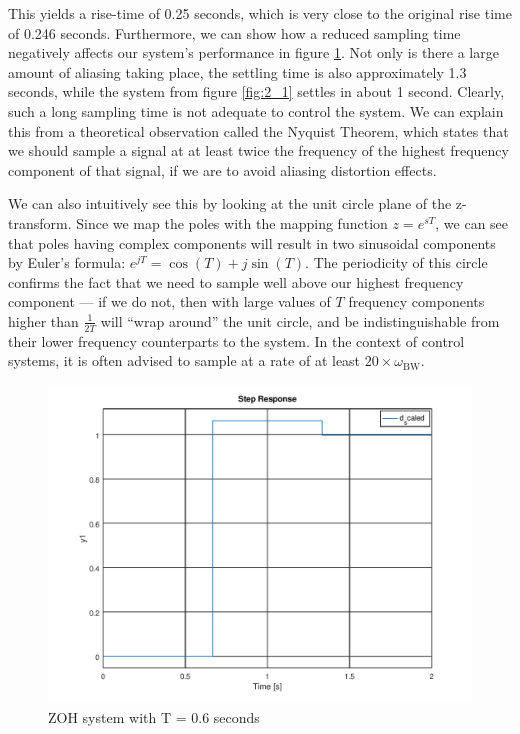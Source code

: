 \documentclass[a4paper, 12pt]{article}
\begin{document}
This yields a rise-time of 0.25 seconds, which is very close to the original
rise time of 0.246 seconds. Furthermore, we can show how a reduced sampling
time negatively affects our system's performance in figure \ref{fig:2_2}. Not
only is there a large amount of aliasing taking place, the settling time is
also approximately 1.3 seconds, while the system from figure \ref{fig:2_1}
settles in about 1 second. Clearly, such a long sampling time is not adequate
to control the system. We can explain this from a theoretical observation
called the Nyquist Theorem, which states that we should sample a signal at at
least twice the frequency of the highest frequency component of that signal, if
we are to avoid aliasing distortion effects.

We can also intuitively see this by looking at the unit circle plane of the
z-transform. Since we map the poles with the mapping function $z = e^{sT}$, we
can see that poles having complex components will result in two sinusoidal
components by Euler's formula: $e^{jT} = \cos(T) + j \sin(T)$. The periodicity
of this circle confirms the fact that we need to sample well above our highest
frequency component --- if we do not, then with large values of $T$ frequency
components higher than $\frac{1}{2T}$ will ``wrap around'' the unit circle, and
be indistinguishable from their lower frequency counterparts to the system. In
the context of control systems, it is often advised to sample at a rate of at
least $20 \times \omega_{\text{BW}}$.

\begin{figure}[H]
  \centering
  \includegraphics[width=\textwidth]{./img/2_2.png}
  \caption{ZOH system with T = 0.6 seconds}
  \label{fig:2_2}
\end{figure}
\end{document}
